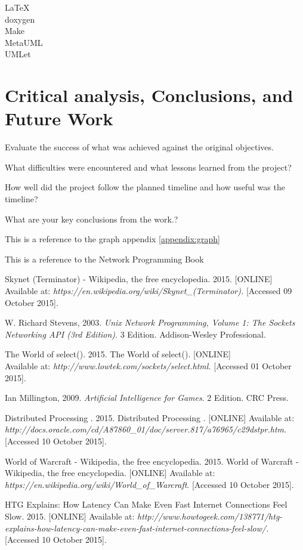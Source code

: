 \documentclass[12pt,a4paper,titlepage]{article}
\begin{document}
LaTeX\\
doxygen\\
Make\\
MetaUML\\
UMLet\\

\section{Critical analysis, Conclusions, and Future Work}

Evaluate the success of what was achieved against the original objectives. 

What difficulties were encountered and what lessons learned from the project? 

How well did the project follow the planned timeline and how useful was the timeline?  

What are your key conclusions from the work.?

This is a reference to the graph appendix \ref{appendix:graph}

This is a reference to the Network Programming Book \cite[p.~215]{stevensunp}

\newpage

\begin{thebibliography}{99}

Skynet (Terminator) - Wikipedia, the free encyclopedia. 2015. [ONLINE] Available at: \textit{https://en.wikipedia.org/wiki/Skynet\_(Terminator).} [Accessed 09 October 2015].

W. Richard Stevens, 2003. \textit{Unix Network Programming, Volume 1: The Sockets Networking API (3rd Edition)}. 3 Edition. Addison-Wesley Professional.

The World of select(). 2015. The World of select(). [ONLINE] \\
Available at: \textit{http://www.lowtek.com/sockets/select.html.} [Accessed 01 October 2015].

Ian Millington, 2009. \textit{Artificial Intelligence for Games}. 2 Edition. CRC Press.

Distributed Processing . 2015. Distributed Processing . [ONLINE] Available at: \textit{http://docs.oracle.com/cd/A87860\_01/doc/server.817/a76965/c29dstpr.htm}. [Accessed 10 October 2015].

World of Warcraft - Wikipedia, the free encyclopedia. 2015. World of Warcraft - Wikipedia, the free encyclopedia. [ONLINE] Available at: \textit{https://en.wikipedia.org/wiki/World\_of\_Warcraft}. [Accessed 10 October 2015].

HTG Explains: How Latency Can Make Even Fast Internet Connections Feel Slow. 2015. [ONLINE] Available at: \textit{http://www.howtogeek.com/138771/htg-explains-how-latency-can-make-even-fast-internet-connections-feel-slow/.} [Accessed 10 October 2015].

\end{thebibliography}
\end{document}

